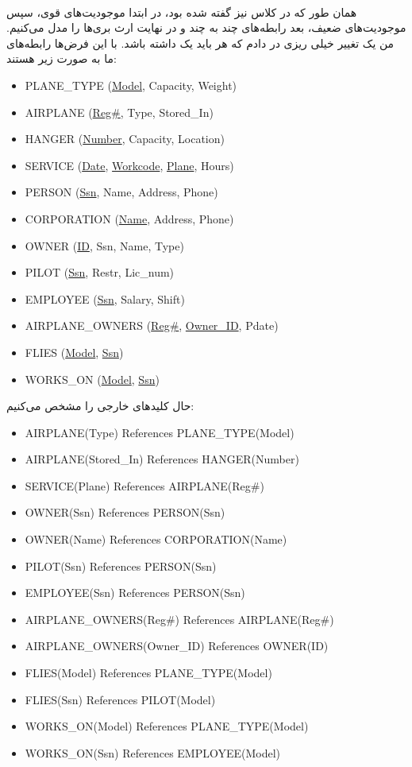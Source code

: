 \\
همان طور که در کلاس نیز گفته شده بود، در ابتدا موجودیت‌های قوی، سپس موجودیت‌های ضعیف، بعد رابطه‌های چند به چند
و در نهایت ارث بری‌ها را مدل می‌کنیم. من یک تغییر خیلی ریزی در
دادم که هر
باید یک
داشته باشد. با این فرض‌ها رابطه‌های ما به صورت زیر هستند:
\begin{latin}
\begin{itemize}
    \item PLANE\_TYPE (\underline{Model}, Capacity, Weight)
    \item AIRPLANE (\underline{Reg\#}, Type, Stored\_In)
    \item HANGER (\underline{Number}, Capacity, Location)
    \item SERVICE (\underline{Date}, \underline{Workcode}, \underline{Plane}, Hours)
    \item PERSON (\underline{Ssn}, Name, Address, Phone)
    \item CORPORATION (\underline{Name}, Address, Phone)
    \item OWNER (\underline{ID}, Ssn, Name, Type)
    \item PILOT (\underline{Ssn}, Restr, Lic\_num)
    \item EMPLOYEE (\underline{Ssn}, Salary, Shift)
    \item AIRPLANE\_OWNERS (\underline{Reg\#}, \underline{Owner\_ID}, Pdate)
    \item FLIES (\underline{Model}, \underline{Ssn})
    \item WORKS\_ON (\underline{Model}, \underline{Ssn})
\end{itemize}
\end{latin}
\noindent
حال کلید‌های خارجی را مشخص می‌کنیم:
\begin{latin}
\begin{itemize}
    \item AIRPLANE(Type) References PLANE\_TYPE(Model)
    \item AIRPLANE(Stored\_In) References HANGER(Number)
    \item SERVICE(Plane) References AIRPLANE(Reg\#)
    \item OWNER(Ssn) References PERSON(Ssn)
    \item OWNER(Name) References CORPORATION(Name)
    \item PILOT(Ssn) References PERSON(Ssn)
    \item EMPLOYEE(Ssn) References PERSON(Ssn)
    \item AIRPLANE\_OWNERS(Reg\#) References AIRPLANE(Reg\#)
    \item AIRPLANE\_OWNERS(Owner\_ID) References OWNER(ID)
    \item FLIES(Model) References PLANE\_TYPE(Model)
    \item FLIES(Ssn) References PILOT(Model)
    \item WORKS\_ON(Model) References PLANE\_TYPE(Model)
    \item WORKS\_ON(Ssn) References EMPLOYEE(Model)
\end{itemize}
\end{latin}
